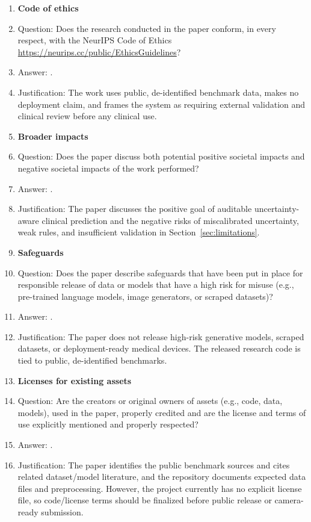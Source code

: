 \begin{enumerate}
\item {\bf Code of ethics}
    \item[] Question: Does the research conducted in the paper conform, in every respect, with the NeurIPS Code of Ethics \url{https://neurips.cc/public/EthicsGuidelines}?
    \item[] Answer: \answerYes{}.
    \item[] Justification: The work uses public, de-identified benchmark data, makes no deployment claim, and frames the system as requiring external validation and clinical review before any clinical use.

\item {\bf Broader impacts}
    \item[] Question: Does the paper discuss both potential positive societal impacts and negative societal impacts of the work performed?
    \item[] Answer: \answerYes{}.
    \item[] Justification: The paper discusses the positive goal of auditable uncertainty-aware clinical prediction and the negative risks of miscalibrated uncertainty, weak rules, and insufficient validation in Section~\ref{sec:limitations}.

\item {\bf Safeguards}
    \item[] Question: Does the paper describe safeguards that have been put in place for responsible release of data or models that have a high risk for misuse (e.g., pre-trained language models, image generators, or scraped datasets)?
    \item[] Answer: \answerNA{}.
    \item[] Justification: The paper does not release high-risk generative models, scraped datasets, or deployment-ready medical devices. The released research code is tied to public, de-identified benchmarks.

\item {\bf Licenses for existing assets}
    \item[] Question: Are the creators or original owners of assets (e.g., code, data, models), used in the paper, properly credited and are the license and terms of use explicitly mentioned and properly respected?
    \item[] Answer: \answerNo{}.
    \item[] Justification: The paper identifies the public benchmark sources and cites related dataset/model literature, and the repository documents expected data files and preprocessing. However, the project currently has no explicit license file, so code/license terms should be finalized before public release or camera-ready submission.


\end{enumerate}

